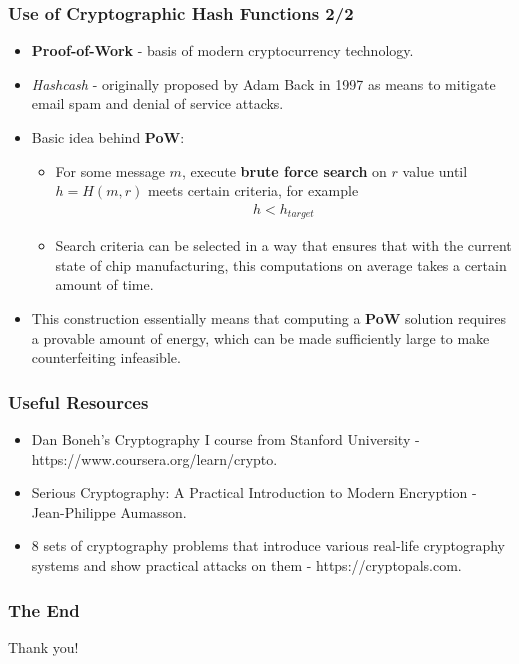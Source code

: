 \documentclass{beamer}
\begin{document}
\begin{frame}
  \frametitle{Use of Cryptographic Hash Functions 2/2}
  \begin{itemize}
  \item \textbf{Proof-of-Work} - basis of modern cryptocurrency technology.
  \item \textit{Hashcash} - originally proposed by Adam Back in 1997 as means to
    mitigate email spam and denial of service attacks.
  \item Basic idea behind \textbf{PoW}:
    \begin{itemize}
    \item For some message $m$, execute \textbf{brute force search} on $r$ value
      until $h = H(m, r)$ meets certain criteria, for example
      \begin{align*}
        h < h_{target}
      \end{align*}
    \item Search criteria can be selected in a way that ensures that with the
      current state of chip manufacturing, this computations on average takes a
      certain amount of time.
    \end{itemize}
  \item This construction essentially means that computing a \textbf{PoW}
    solution requires a provable amount of energy, which can be made
    sufficiently large to make counterfeiting infeasible.
  \end{itemize}
\end{frame}

\begin{frame}
  \frametitle{Useful Resources}
  \begin{itemize}
  \item Dan Boneh's Cryptography I course from Stanford University -
    https://www.coursera.org/learn/crypto.
  \item Serious Cryptography: A Practical Introduction to Modern Encryption -
    Jean-Philippe Aumasson.
  \item 8 sets of cryptography problems that introduce various real-life
    cryptography systems and show practical attacks on them -
    https://cryptopals.com.
  \end{itemize}
\end{frame}

\begin{frame}
  \frametitle{The End}
  \begin{center}
    Thank you!
  \end{center}
\end{frame}
\end{document}
